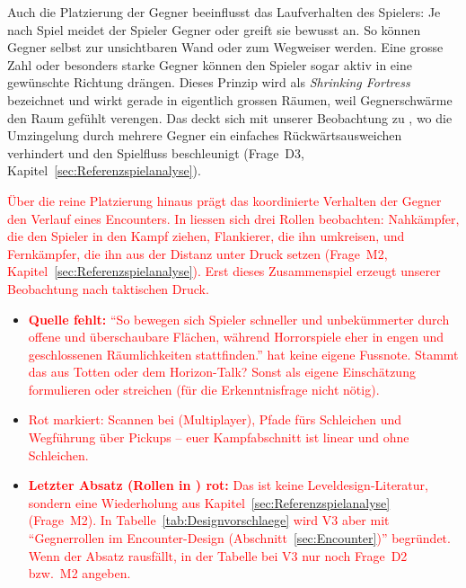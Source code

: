 \documentclass[../Main.tex]{subfiles}
\begin{document}
Auch die Platzierung der Gegner beeinflusst das Laufverhalten des Spielers: Je nach Spiel meidet der Spieler Gegner oder greift sie bewusst an. So können Gegner selbst zur unsichtbaren Wand oder zum Wegweiser werden.\autocite{totten2014architectural} Eine grosse Zahl oder besonders starke Gegner können den Spieler sogar aktiv in eine gewünschte Richtung drängen. Dieses Prinzip wird als \textit{Shrinking Fortress} bezeichnet und wirkt gerade in eigentlich grossen Räumen, weil Gegnerschwärme den Raum gefühlt verengen.\autocite{totten2014architectural} Das deckt sich mit unserer Beobachtung zu , wo die Umzingelung durch mehrere Gegner ein einfaches Rückwärtsausweichen verhindert und den Spielfluss beschleunigt (Frage~D3, Kapitel~\ref{sec:Referenzspielanalyse}).

\textcolor{red}{Über die reine Platzierung hinaus prägt das koordinierte Verhalten der Gegner den Verlauf eines Encounters. In  liessen sich drei Rollen beobachten: Nahkämpfer, die den Spieler in den Kampf ziehen, Flankierer, die ihn umkreisen, und Fernkämpfer, die ihn aus der Distanz unter Druck setzen (Frage~M2, Kapitel~\ref{sec:Referenzspielanalyse}). Erst dieses Zusammenspiel erzeugt unserer Beobachtung nach taktischen Druck.}

\begin{itemize}[leftmargin=1.5cm]
    \item \textcolor{red}{\textbf{Quelle fehlt:} \enquote{So bewegen sich Spieler schneller und unbekümmerter durch offene und überschaubare Flächen, während Horrorspiele eher in engen und geschlossenen Räumlichkeiten stattfinden.} hat keine eigene Fussnote. Stammt das aus Totten oder dem Horizon-Talk? Sonst als eigene Einschätzung formulieren oder streichen (für die Erkenntnisfrage nicht nötig).}
    \item \textcolor{red}{Rot markiert: Scannen bei  (Multiplayer), Pfade fürs Schleichen und Wegführung über Pickups -- euer Kampfabschnitt ist linear und ohne Schleichen.}
    \item \textcolor{red}{\textbf{Letzter Absatz (Rollen in ) rot:} Das ist keine Leveldesign-Literatur, sondern eine Wiederholung aus Kapitel~\ref{sec:Referenzspielanalyse} (Frage~M2). In Tabelle~\ref{tab:Designvorschlaege} wird V3 aber mit \enquote{Gegnerrollen im Encounter-Design (Abschnitt~\ref{sec:Encounter})} begründet. Wenn der Absatz rausfällt, in der Tabelle bei V3 nur noch Frage~D2 bzw.\ M2 angeben.}
\end{itemize}
\end{document}
